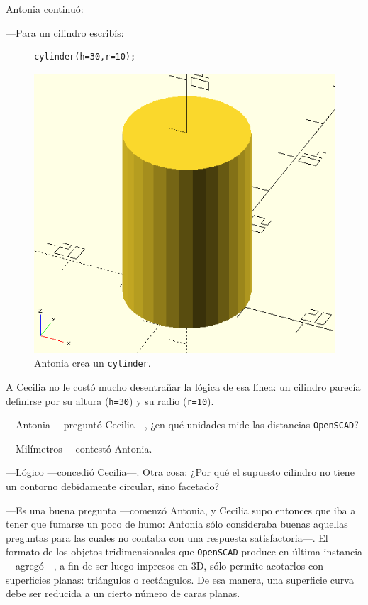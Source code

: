 Antonia continuó:

---Para un cilindro escribís:

\begin{figure}[ht]
  \begin{minipage}[]{.4\textwidth}
    \begin{lstlisting}[numbers=none]
cylinder(h=30,r=10);
    \end{lstlisting}
  \end{minipage}\hfill
   \begin{minipage}[]{.6\textwidth}
     \centering
     \includegraphics[width=.9\textwidth]{imagenes/cilindro}
   \end{minipage}
  \caption{Antonia crea un \lstinline!cylinder!.}
  \label{fig:cilindro}
\end{figure}


 A Cecilia no le costó mucho desentrañar la lógica de esa línea: un
 cilindro parecía definirse por su altura (\lstinline!h=30!) y su
 radio (\lstinline!r=10!).

 ---Antonia ---preguntó Cecilia---, ¿en qué unidades mide las
 distancias \texttt{OpenSCAD}?

 ---Milímetros ---contestó Antonia.

 ---Lógico ---concedió Cecilia---. Otra cosa: ¿Por qué el supuesto
 cilindro no tiene un contorno debidamente circular, sino facetado?

 ---Es una buena pregunta ---comenzó Antonia, y Cecilia supo entonces
 que iba a tener que fumarse un poco de humo: Antonia sólo consideraba
 buenas aquellas preguntas para las cuales no contaba con una
 respuesta satisfactoria---. El formato de los objetos
 tridimensionales que \texttt{OpenSCAD} produce en última instancia
 ---agregó---, a fin de ser luego impresos en 3D, sólo permite
 acotarlos con superficies planas: triángulos o rectángulos. De esa
 manera, una superficie curva debe ser reducida a un cierto número de
 caras planas.
 
